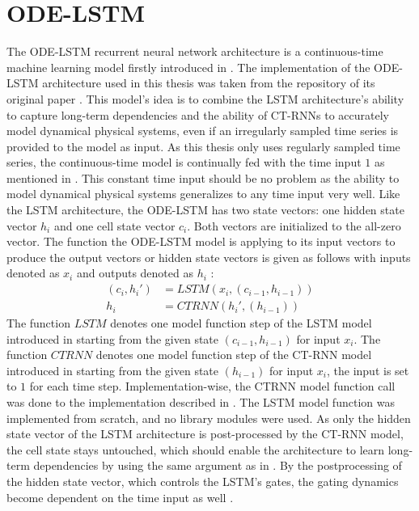 \documentclass[draft,final]{vutinfth} %
\begin{document}
    \section{ODE-LSTM} \label{odelstm}
    The ODE-LSTM recurrent neural network architecture is a continuous-time machine learning model firstly introduced in \cite{ODELSTM}.
    The implementation of the ODE-LSTM architecture used in this thesis was taken from the repository of its original paper \cite{ODELSTM}.
    This model's idea is to combine the LSTM architecture's ability to capture long-term dependencies and the ability of CT-RNNs to accurately model dynamical physical systems, even if an irregularly sampled time series is provided to the model as input.
    As this thesis only uses regularly sampled time series, the continuous-time model is continually fed with the time input $1$ as mentioned in .
    This constant time input should be no problem as the ability to model dynamical physical systems generalizes to any time input very well.
    Like the LSTM architecture, the ODE-LSTM has two state vectors: one hidden state vector $h_i$ and one cell state vector $c_i$. Both vectors are initialized to the all-zero vector.
    The function the ODE-LSTM model is applying to its input vectors to produce the output vectors or hidden state vectors is given as follows with inputs denoted as $x_i$ and outputs denoted as $h_i$ \cite[p. 5]{ODELSTM}:
    \begin{align}
    (c_i,h_i')
        &= LSTM(x_i, (c_{i-1}, h_{i-1})) \\
        h_i &= CTRNN(h_i', (h_{i-1}))
    \end{align}
    The function $LSTM$ denotes one model function step of the LSTM model introduced in  starting from the given state $(c_{i-1}, h_{i-1})$ for input $x_i$.
    The function $CTRNN$ denotes one model function step of the CT-RNN model introduced in  starting from the given state $(h_{i-1})$ for input $x_i$, the input is set to $1$ for each time step.
    Implementation-wise, the CTRNN model function call was done to the implementation described in .
    The LSTM model function was implemented from scratch, and no library modules were used.
    As only the hidden state vector of the LSTM architecture is post-processed by the CT-RNN model, the cell state stays untouched, which should enable the architecture to learn long-term dependencies by using the same argument as in .
    By the postprocessing of the hidden state vector, which controls the LSTM's gates, the gating dynamics become dependent on the time input as well \cite[p. 4]{ODELSTM}.
\end{document}
